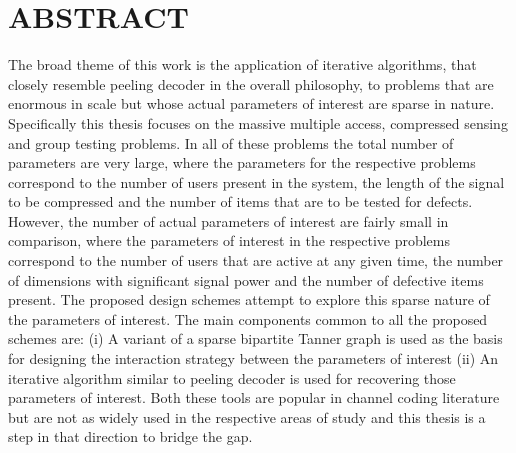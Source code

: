 %
%
%
%

\chapter*{ABSTRACT}

\pagestyle{plain} %
\setcounter{page}{2}

\indent The broad theme of this work is the application of iterative algorithms, that closely resemble peeling decoder in the overall philosophy, to problems that are enormous in scale but whose actual parameters of interest are sparse in nature. Specifically this thesis focuses on the massive multiple access, compressed sensing and group testing problems. In all of these problems the total number of parameters are very large, where the parameters for the respective problems correspond to the number of users present in the system, the length of the signal to be compressed and the number of items that are to be tested for defects. However, the number of actual parameters of interest are fairly small in comparison, where the parameters of interest in the respective problems correspond to the number of users that are active at any given time, the number of dimensions with significant signal power and the number of defective items present. The proposed design schemes attempt to explore this sparse nature of the parameters of interest. The main components common to all the proposed schemes are: (i) A variant of a sparse bipartite Tanner graph is used as the basis for designing the interaction strategy between the parameters of interest (ii) An iterative algorithm similar to peeling decoder is used for recovering those parameters of interest. Both these tools are popular in channel coding literature \cite{richardson2008modern} but are not as widely used in the respective areas of study and this thesis is a step in that direction to bridge the gap.

